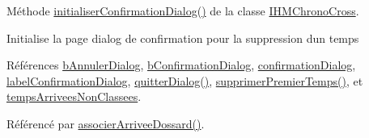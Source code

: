 Méthode \hyperlink{class_i_h_m_chrono_cross_a866a247fad23eca2af31ed985afe7cd3}{initialiser\+Confirmation\+Dialog()} de la classe \hyperlink{class_i_h_m_chrono_cross}{I\+H\+M\+Chrono\+Cross}. 

Initialise la page dialog de confirmation pour la suppression d\textquotesingle{}un temps 

Références \hyperlink{class_i_h_m_chrono_cross_a7d2639da4d7d7afae5d2a66e83695a4e}{b\+Annuler\+Dialog}, \hyperlink{class_i_h_m_chrono_cross_a57bb61d8175dc09f0497ee3834cb6ad5}{b\+Confirmation\+Dialog}, \hyperlink{class_i_h_m_chrono_cross_ad7fc4afa5689501063cc207a8daf5752}{confirmation\+Dialog}, \hyperlink{class_i_h_m_chrono_cross_a20522f998469b4b34b8939dce6b239b3}{label\+Confirmation\+Dialog}, \hyperlink{class_i_h_m_chrono_cross_a1e8e6d42ec7397a619940bc7bec4a6ca}{quitter\+Dialog()}, \hyperlink{class_i_h_m_chrono_cross_aca8b5d6683a3ab0018066ec16968f3f3}{supprimer\+Premier\+Temps()}, et \hyperlink{class_i_h_m_chrono_cross_a9d0542a5334cd284d1ea9cf732cb013e}{temps\+Arrivees\+Non\+Classees}.



Référencé par \hyperlink{class_i_h_m_chrono_cross_a9f7f1ad130b60300a879694b6234f161}{associer\+Arrivee\+Dossard()}.


